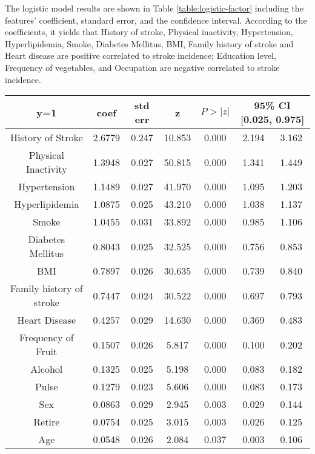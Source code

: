 \documentclass{article}
\begin{document}
 The logistic model results are shown in Table \ref{table:logistic-factor}   including the features' coefficient, standard error, and the confidence interval. 
 According to the coefficients, it yields that History of stroke, Physical inactivity,  Hypertension, Hyperlipidemia, Smoke, Diabetes Mellitus, BMI, Family history of stroke and Heart disease are positive correlated to stroke incidence; Education level, Frequency of vegetables, and Occupation are negative correlated to stroke incidence.  
\begin{table}[H]
\small
\centering
\begin{tabular}{ccccccc}
\hline
\textbf{y=1}             & \textbf{coef} & \textbf{std err} & \textbf{z} & \textbf{$P >|z|$} & \multicolumn{2}{c}{\textbf{95\% CI {[}0.025, 0.975{]}}} \\ \hline
History of Stroke        & 2.6779  & 0.247 & 10.853  & 0.000 & 2.194  & 3.162  \\
Physical Inactivity      & 1.3948  & 0.027 & 50.815  & 0.000 & 1.341  & 1.449  \\
Hypertension             & 1.1489  & 0.027 & 41.970  & 0.000 & 1.095  & 1.203  \\
Hyperlipidemia           & 1.0875  & 0.025 & 43.210  & 0.000 & 1.038  & 1.137  \\
Smoke                    & 1.0455  & 0.031 & 33.892  & 0.000 & 0.985  & 1.106  \\
Diabetes Mellitus        & 0.8043  & 0.025 & 32.525  & 0.000 & 0.756  & 0.853  \\
BMI                      & 0.7897  & 0.026 & 30.635  & 0.000 & 0.739  & 0.840  \\
Family history of stroke & 0.7447  & 0.024 & 30.522  & 0.000 & 0.697  & 0.793  \\
Heart Disease            & 0.4257  & 0.029 & 14.630  & 0.000 & 0.369  & 0.483  \\
Frequency of Fruit       & 0.1507  & 0.026 & 5.817   & 0.000 & 0.100  & 0.202  \\
Alcohol                  & 0.1325  & 0.025 & 5.198   & 0.000 & 0.083  & 0.182  \\
Pulse                    & 0.1279  & 0.023 & 5.606   & 0.000 & 0.083  & 0.173  \\
Sex                      & 0.0863  & 0.029 & 2.945   & 0.003 & 0.029  & 0.144  \\
Retire                   & 0.0754  & 0.025 & 3.015   & 0.003 & 0.026  & 0.125  \\
Age                      & 0.0548  & 0.026 & 2.084   & 0.037 & 0.003  & 0.106  \\

\end{tabular}
\end{table}
\end{document}
